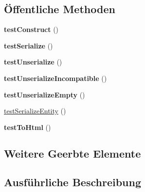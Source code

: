 \subsection*{Öffentliche Methoden}
\begin{DoxyCompactItemize}
\item 
\mbox{\label{class_sabre_1_1_d_a_v_1_1_xml_1_1_property_1_1_href_test_a2441c9add54e2dc4e8c3db5d2ec47613}} 
{\bfseries test\+Construct} ()
\item 
\mbox{\label{class_sabre_1_1_d_a_v_1_1_xml_1_1_property_1_1_href_test_ad97600d7343368417c90ac2ddee85b04}} 
{\bfseries test\+Serialize} ()
\item 
\mbox{\label{class_sabre_1_1_d_a_v_1_1_xml_1_1_property_1_1_href_test_a00fbf4fa20eea12410d58e31b95c1d7d}} 
{\bfseries test\+Unserialize} ()
\item 
\mbox{\label{class_sabre_1_1_d_a_v_1_1_xml_1_1_property_1_1_href_test_ac95b49fb48f1fbbbb50f2797bc53143e}} 
{\bfseries test\+Unserialize\+Incompatible} ()
\item 
\mbox{\label{class_sabre_1_1_d_a_v_1_1_xml_1_1_property_1_1_href_test_a81aa35f0f42664e67b34ab9d5bcb42f9}} 
{\bfseries test\+Unserialize\+Empty} ()
\item 
\mbox{\hyperlink{class_sabre_1_1_d_a_v_1_1_xml_1_1_property_1_1_href_test_a5925d9f3a9fb6e4efcd872fe283ceb9f}{test\+Serialize\+Entity}} ()
\item 
\mbox{\label{class_sabre_1_1_d_a_v_1_1_xml_1_1_property_1_1_href_test_a03b61107781bed720c592033b3eb9456}} 
{\bfseries test\+To\+Html} ()
\end{DoxyCompactItemize}
\subsection*{Weitere Geerbte Elemente}


\subsection{Ausführliche Beschreibung}


